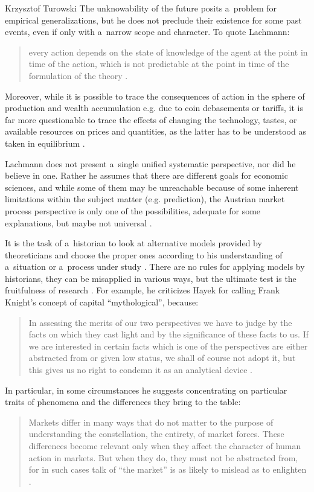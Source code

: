 \begin{artengenv}{Krzysztof Turowski}
The unknowability of the future posits a~problem for empirical generalizations, but he does not preclude their existence for some past events, even if only with a~narrow scope and character. To quote Lachmann:
\begin{quote}
every action depends on the state of knowledge of the agent at the point in time of the action, which is not predictable at the point in time of the formulation of the theory \parencite[61]{lachmann-significance}.
\end{quote}
Moreover, while it is possible to trace the consequences of action in the sphere of production and wealth accumulation e.g. due to coin debasements or tariffs, it is far more questionable to trace the effects of changing the technology, tastes, or available resources on prices and quantities, as the latter has to be understood as taken in equilibrium \parencite[32--33]{lachmann1986market}.

Lachmann does not present a~single unified systematic perspective, nor did he believe in one. Rather he assumes that there are different goals for economic sciences, and while some of them may be unreachable because of some inherent limitations within the subject matter (e.g. prediction), the Austrian market process perspective is only one of the possibilities, adequate for some explanations, but maybe not universal \parencite[41]{lachmann1986market}.

It is the task of a~historian to look at alternative models provided by theoreticians and choose the proper ones according to his understanding of a~situation or a~process under study \parencite[179]{lachmann-science}. There are no rules for applying models by historians, they can be misapplied in various ways, but the ultimate test is the fruitfulness of research \parencite[175]{lachmann-science}.
For example, he criticizes Hayek for calling Frank Knight's concept of capital ``mythological'', because:
\begin{quote}
In assessing the merits of our two perspectives we have to judge by the facts on which they cast light and by the significance of these facts to us. If we are interested in certain facts which is one of the perspectives are either abstracted from or given low status, we shall of course not adopt it, but this gives us no right to condemn it as an analytical device \parencite[175]{lachmann-salvage}.
\end{quote}
In particular, in some circumstances he suggests concentrating on particular traits of phenomena and the differences they bring to the table:
\begin{quote}
Markets differ in many ways that do not matter to the purpose of understanding the constellation, the entirety, of market forces. These differences become relevant only when they affect the character of human action in markets. But when they do, they must not be abstracted from, for in such cases talk of ``the market'' is as likely to mislead as to enlighten \parencite[271]{lachmann-speculative-markets}.
\end{quote}


\end{artengenv}
